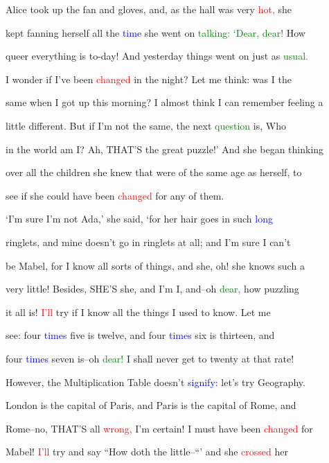  Alice took up the fan and gloves, and, as the hall was very \textcolor{red}{hot,} she

 kept fanning herself all the \textcolor{blue}{time} she went on \textcolor{green}{talking:} \textcolor{green}{‘Dear,} \textcolor{green}{dear!} How

 queer everything is to-day! And yesterday things went on just as \textcolor{green}{usual.}

 I wonder if I’ve been \textcolor{red}{changed} in the night? Let me think: was I the

 same when I got up this morning? I almost think I can remember feeling a

 little different. But if I’m not the same, the next \textcolor{green}{question} is, Who

 in the world am I? Ah, THAT’S the great puzzle!’ And she began thinking

 over all the \textcolor{BurntOrange}{children} she knew that were of the same age as herself, to

 see if she could have been \textcolor{red}{changed} for any of them.



 ‘I’m sure I’m not Ada,’ she said, ‘for her hair goes in such \textcolor{blue}{long}

 ringlets, and mine doesn’t go in ringlets at all; and I’m sure I can’t

 be Mabel, for I know all sorts of things, and she, oh! she knows such a

 very little! Besides, SHE’S she, and I’m I, and--oh \textcolor{green}{dear,} how puzzling

 it all is! \textcolor{red}{I’ll} try if I know all the things I used to know. Let me

 see: four \textcolor{blue}{times} five is twelve, and four \textcolor{blue}{times} six is thirteen, and

 four \textcolor{blue}{times} seven is--oh \textcolor{green}{dear!} I shall never get to twenty at that rate!

 However, the Multiplication Table doesn’t \textcolor{blue}{signify:} let’s try Geography.

 London is the capital of Paris, and Paris is the capital of Rome, and

 Rome--no, THAT’S all \textcolor{red}{wrong,} I’m certain! I must have been \textcolor{red}{changed} for

 Mabel! \textcolor{red}{I’ll} try and say “How doth the little--“’ and she \textcolor{red}{crossed} her

